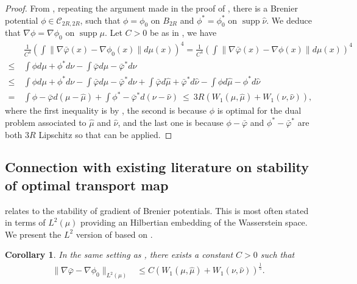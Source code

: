 \documentclass[11pt]{article}
\newtheorem{corollary}[lemma]{Corollary}
\DeclareMathOperator{\supp}{supp}
\newcommand{\1}{\mathbbm{1}}
\numberwithin{equation}{section}
\begin{document}
\begin{proof}
    From , repeating the argument made in the proof of , there is a Brenier potential $\phi \in \mathcal{C}_{2R,2R}$, such that $\phi = \phi_0$ on $B_{2R}$ and $\phi^* = \phi_0^*$ on $\supp \hat{\nu}$. We deduce that $\nabla \phi = \nabla \phi_0$ on $\supp \mu$.
    Let $C>0$ be as in  , we have
    \begin{align*}
        &\frac{1}{C^4} \left(\int \| \nabla \bar{\varphi}(x) - \nabla \phi_0(x)\| d\mu(x)\right)^4  = \frac{1}{C^4} \left(\int \| \nabla \bar{\varphi}(x) - \nabla \phi(x)\| d\mu(x)\right)^4  \\
        \leq\ &\int \phi d\mu + \phi^*d\nu - \int \bar{\varphi} d \mu - \bar{\varphi}^* d\nu\\
        \leq\ & \int \phi d\mu + \phi^*d\nu - \int \bar{\varphi} d \mu -\bar{\varphi}^* d\nu +  \int \bar{\varphi} d \hat\mu + \bar{\varphi}^* d\hat\nu - \int \phi d\hat\mu - \phi^*d\hat\nu \\
        =&\int \phi - \bar{\varphi} d(\mu - \hat{\mu}) + \int \phi^* - \bar{\varphi}^* d(\nu - \hat\nu) \ \leq\  3R(W_1(\mu,\hat{\mu}) + W_1 (\nu, \hat{\nu})),
    \end{align*}
    where the first inequality is by , the second is because $\phi$ is optimal for the dual problem associated to $\hat{\mu}$ and $\hat{\nu}$, and the last one is because $\phi - \bar\varphi$ and $\phi^* - \bar\varphi^*$ are both $3R$ Lipschitz so that \cite[Theorem 1.14]{ref_villani_topics} can be applied. 
\end{proof}


\subsection{Connection with existing literature on stability of optimal transport map}\label{sec:connection_literature_stability}
 relates to the stability of gradient of Brenier potentials. This is most often stated in terms of $L^2(\mu)$ providing an Hilbertian embedding of the Wasserstein space. We present the $L^2$ version of  based on .

\begin{corollary}
    In the same setting as , there exists a constant $C>0$ such that 
    \begin{align*}
       \|\nabla \bar{\varphi}-\nabla \phi_0\|_{L^2(\mu)} &\leq C\left(W_1(\mu,\hat{\mu}) + W_1 (\nu, \hat{\nu})\right)^{\frac{1}{5}}.
    \end{align*}
    \label{cor:simplerform2_L2}
\end{corollary}
\end{document}
